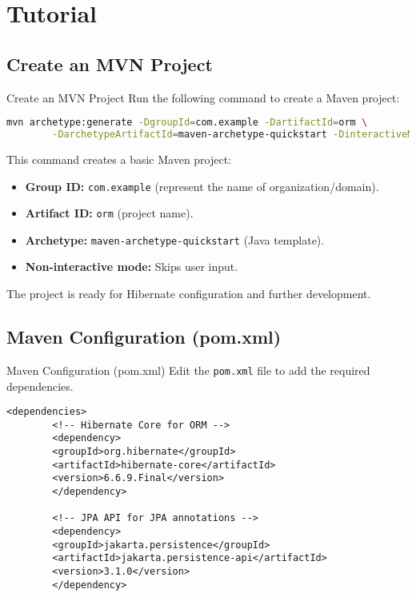 \documentclass[aspectratio=169, table]{beamer}
\begin{document}
\section{Tutorial}

\subsection{Create an MVN Project}
\begin{frame}[fragile]{Create an MVN Project}
	\vspace{20pt}
	Run the following command to create a Maven project:
	\begin{lstlisting}[language=bash]
		mvn archetype:generate -DgroupId=com.example -DartifactId=orm \
		-DarchetypeArtifactId=maven-archetype-quickstart -DinteractiveMode=false
	\end{lstlisting}
	
	This command creates a basic Maven project:
	\begin{itemize}
		\item \textbf{Group ID:} \texttt{com.example} (represent the name of organization/domain).
		\item \textbf{Artifact ID:} \texttt{orm} (project name).
		\item \textbf{Archetype:} \texttt{maven-archetype-quickstart} (Java template).
		\item \textbf{Non-interactive mode:} Skips user input.
	\end{itemize}
	
	The project is ready for Hibernate configuration and further development.
\end{frame}

\subsection{Maven Configuration (pom.xml)}

\begin{frame}[fragile]{Maven Configuration (pom.xml)}
	\vspace{20pt}
	Edit the \texttt{pom.xml} file to add the required dependencies.
	
	\begin{lstlisting}[style=XmlStyle]
		<dependencies>
		<!-- Hibernate Core for ORM -->
		<dependency>
		<groupId>org.hibernate</groupId>
		<artifactId>hibernate-core</artifactId>
		<version>6.6.9.Final</version>
		</dependency>
		
		<!-- JPA API for JPA annotations -->
		<dependency>
		<groupId>jakarta.persistence</groupId>
		<artifactId>jakarta.persistence-api</artifactId>
		<version>3.1.0</version>
		</dependency>

	\end{lstlisting}
\end{frame}
\end{document}
